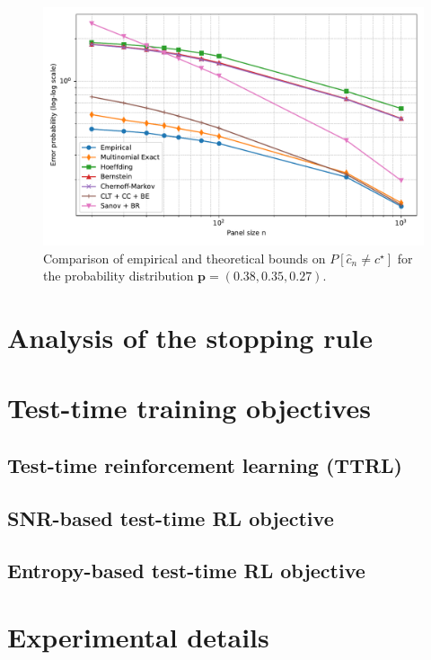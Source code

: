 \documentclass{article} %
\begin{document}
\begin{figure}[!h]
\begin{center}
\includegraphics[width=0.9\linewidth]{figs/empirical_vs_theoreticalbounds.pdf}
\end{center}
\caption{Comparison of empirical and theoretical bounds on $P[\widehat{c}_n \neq c^\star]$ for the probability distribution $\mathbf{p} = (0.38, 0.35, 0.27)$.}
\label{fig:comparison_bounds_majority_vote}
\end{figure}

\section{Analysis of the stopping rule}\label{app:details_stopping_rule}



\section{Test-time training objectives}\label{app:details_test_time_training_loss}

\subsection{Test-time reinforcement learning (TTRL)}\label{app:subsec_analysis_TTRL}


\subsection{SNR-based test-time RL objective}\label{app:details_new_TTT_loss}


\subsection{Entropy-based test-time RL objective}\label{app:subsec_analysis_TTTEntropy}


\section{Experimental details}\label{app:numerical_experiments_details}

\end{document}

